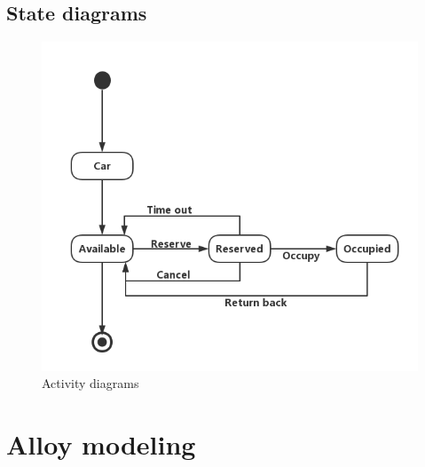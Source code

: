 \documentclass[12pt, letterpaper]{article}
\begin{document}
\newpage
\subsection{State diagrams}

\begin{figure}[H]
\centering
\includegraphics[width=\textwidth]{state.png}
\caption{Activity diagrams}
\end{figure}

\newpage

\section{Alloy modeling}
\end{document}

